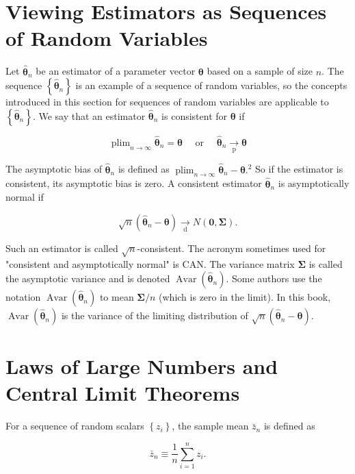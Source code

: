 \documentclass[10pt]{article}
\begin{document}
\section*{Viewing Estimators as Sequences of Random Variables}
Let $\hat{\boldsymbol{\theta}}_{n}$ be an estimator of a parameter vector $\boldsymbol{\theta}$ based on a sample of size $n$. The sequence $\left\{\hat{\boldsymbol{\theta}}_{n}\right\}$ is an example of a sequence of random variables, so the concepts introduced in this section for sequences of random variables are applicable to $\left\{\hat{\boldsymbol{\theta}}_{n}\right\}$. We say that an estimator $\hat{\boldsymbol{\theta}}_{n}$ is consistent for $\boldsymbol{\theta}$ if

$$
\operatorname{plim}_{n \rightarrow \infty} \hat{\boldsymbol{\theta}}_{n}=\boldsymbol{\theta} \quad \text { or } \quad \hat{\boldsymbol{\theta}}_{n} \underset{\mathrm{p}}{\rightarrow} \boldsymbol{\theta}
$$

The asymptotic bias of $\hat{\boldsymbol{\theta}}_{n}$ is defined as $\operatorname{plim}_{n \rightarrow \infty} \hat{\boldsymbol{\theta}}_{n}-\boldsymbol{\theta} .^{2}$ So if the estimator is consistent, its asymptotic bias is zero. A consistent estimator $\hat{\boldsymbol{\theta}}_{n}$ is asymptotically normal if

$$
\sqrt{n}\left(\hat{\boldsymbol{\theta}}_{n}-\boldsymbol{\theta}\right) \underset{\mathrm{d}}{\rightarrow} N(\mathbf{0}, \boldsymbol{\Sigma}) .
$$

Such an estimator is called $\sqrt{n}$-consistent. The acronym sometimes used for "consistent and asymptotically normal" is CAN. The variance matrix $\boldsymbol{\Sigma}$ is called the asymptotic variance and is denoted $\operatorname{Avar}\left(\hat{\boldsymbol{\theta}}_{n}\right)$. Some authors use the notation $\operatorname{Avar}\left(\hat{\boldsymbol{\theta}}_{n}\right)$ to mean $\boldsymbol{\Sigma} / n$ (which is zero in the limit). In this book, $\operatorname{Avar}\left(\hat{\boldsymbol{\theta}}_{n}\right)$ is the variance of the limiting distribution of $\sqrt{n}\left(\hat{\boldsymbol{\theta}}_{n}-\boldsymbol{\theta}\right)$.

\section*{Laws of Large Numbers and Central Limit Theorems}
For a sequence of random scalars $\left\{z_{i}\right\}$, the sample mean $\bar{z}_{n}$ is defined as

$$
\bar{z}_{n} \equiv \frac{1}{n} \sum_{i=1}^{n} z_{i} .
$$
\end{document}

